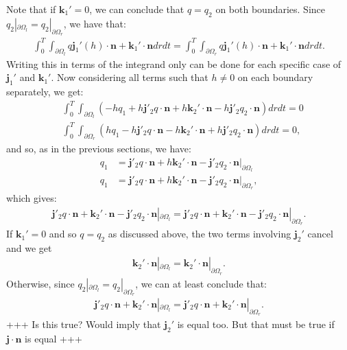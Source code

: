 \documentclass[11pt, a4paper]{article}
\theoremstyle{definition}
\newcommand{\n}{\mathbf{n}}
\newcommand{\jf}{\mathbf j}
\begin{document}
Note that if $\mathbf{k}_1' = 0$, we can conclude that $q = q_2$ on both boundaries.
Since $q_2|_{\partial \Omega_l} = q_2|_{\partial \Omega_r}$, we have that:
\begin{align*}
	\int_0^T \int_{\partial \Omega_l}  q \jf_1'(h)   \cdot \n  +\mathbf{k}_1' \cdot \n   dr dt = \int_0^T \int_{\partial \Omega_r} q \jf_1'(h)   \cdot \n  +  \mathbf{k}_1' \cdot \n  dr dt .
\end{align*}
Writing this in terms of the integrand only can be done for each specific case of $\jf_1'$ and $\mathbf{k}_1'$. 
Now considering all terms such that $h \neq 0$ on each boundary separately, we get:
\begin{align*}
	&\int_0^T \int_{\partial \Omega_l} \left(- h q_1  + h \jf'_2 q \cdot \n + h\mathbf{k}_2' \cdot \n-  h \jf'_2 q_2 \cdot \n \right)   dr  dt =0 \\
	&\int_0^T \int_{\partial \Omega_r} \left( h q_1  - h \jf'_2 q \cdot \n - h\mathbf{k}_2' \cdot \n + h \jf'_2 q_2 \cdot \n \right)   dr  dt =0 ,
\end{align*}
and so, as in the previous sections, we have:
\begin{align*}
	q_1 &=   \jf'_2 q \cdot \n + h\mathbf{k}_2' \cdot \n - \jf'_2 q_2 \cdot \n |_{\partial \Omega_l} \\
	q_1 &=  \jf'_2 q \cdot \n + h\mathbf{k}_2' \cdot \n -\jf'_2 q_2 \cdot \n |_{\partial \Omega_r}, 
\end{align*}
which gives:
\begin{align*}
	\jf'_2 q \cdot \n +  \mathbf{k}_2' \cdot \n - \jf'_2 q_2 \cdot \n |_{\partial \Omega_l} =  \jf'_2 q \cdot \n + \mathbf{k}_2' \cdot \n - \jf'_2 q_2 \cdot \n |_{\partial \Omega_r}.
\end{align*}
If $\mathbf{k}_1' = 0$ and so $q = q_2$ as discussed above, the two terms involving $\jf_2'$ cancel and we get
\begin{align*}
	\mathbf{k}_2' \cdot \n  |_{\partial \Omega_l} =   \mathbf{k}_2' \cdot \n  |_{\partial \Omega_r}.
\end{align*}
Otherwise, since $q_2|_{\partial \Omega_l} = q_2|_{\partial \Omega_r}$, we can at least conclude that:
\begin{align*}
	\jf'_2 q \cdot \n + \mathbf{k}_2' \cdot \n  |_{\partial \Omega_l} =  \jf'_2 q \cdot \n + \mathbf{k}_2' \cdot \n  |_{\partial \Omega_r}.
\end{align*}
+++ Is this true? Would imply that $ \jf_2'$ is equal too. But that must be true if $\jf \cdot \n$ is equal +++
\\
\end{document}
